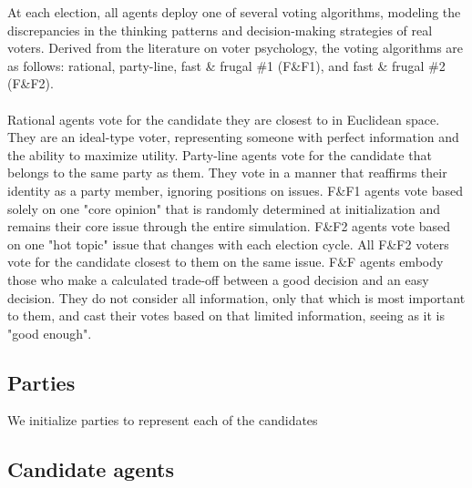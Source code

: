 
At each election, all agents deploy one of several voting algorithms, modeling the
discrepancies in the thinking patterns and decision-making strategies of real voters.
Derived from the literature on voter psychology, the voting algorithms are as follows: 
rational, party-line, fast \& frugal \#1 (F\&F1), and fast \& frugal \#2 (F\&F2).
\\\\
Rational agents vote for the candidate they are closest to in Euclidean space. They are an
ideal-type voter, representing someone with perfect information and the ability to maximize 
utility. Party-line agents vote for the candidate that belongs to the same party as them. They vote in a manner that reaffirms their identity as a party member, ignoring positions on issues. F\&F1 agents vote based solely on one "core opinion" that is randomly determined at initialization and remains their core issue through the entire simulation. F\&F2 agents vote based on one "hot topic"
issue that changes with each election cycle. All F\&F2 voters vote for the candidate closest to them
on the same issue. F\&F agents embody those who make a calculated trade-off between a good decision and an easy decision. They do not consider all information, only that which is most important to them, and cast their votes based on that limited information, seeing as it is "good enough".


\subsection{Parties}


We initialize parties to represent each of the candidates

\subsection{Candidate agents}


